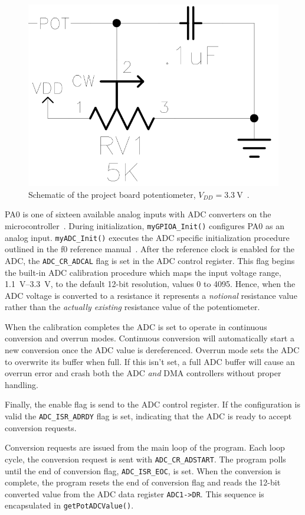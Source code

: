 \begin{figure}[tbph]
  \centering
  \includegraphics[width=0.4\linewidth]{../graphics/schematic_pot}
  \caption{Schematic of the project board potentiometer, $V_{DD} = \SI{3.3}{\volt}$~\cite{FS:PBMCUSLK}.}
  \label{fig:schematic_pot}
\end{figure}

PA0 is one of sixteen available analog inputs with ADC converters on the microcontroller~\cite[ch. 13]{STM:f0ref}.
During initialization, \texttt{myGPIOA\_Init()} configures PA0 as an analog input. \texttt{myADC\_Init()} executes the ADC specific initialization procedure outlined in the f0 reference manual~\cite[ch. 13]{STM:f0ref}.
After the reference clock is enabled for the ADC, the \texttt{ADC\_CR\_ADCAL} flag is set in the ADC control register.
This flag begins the built-in ADC calibration procedure which maps the input voltage range, \SIrange{1.1}{3.3}{\volt}, to the default 12-bit resolution, values 0 to 4095.
Hence, when the ADC voltage is converted to a resistance it represents a \textit{notional} resistance value rather than the \textit{actually existing} resistance value of the potentiometer.

When the calibration completes the ADC is set to operate in continuous conversion and overrun modes.
Continuous conversion will automatically start a new conversion once the ADC value is dereferenced.
Overrun mode sets the ADC to overwrite its buffer when full.
If this isn't set, a full ADC buffer will cause an overrun error and crash both the ADC \textit{and} DMA controllers without proper handling.

Finally, the enable flag is send to the ADC control register.
If the configuration is valid the \texttt{ADC\_ISR\_ADRDY} flag is set, indicating that the ADC is ready to accept conversion requests.

Conversion requests are issued from the main loop of the program.
Each loop cycle, the conversion request is sent with \texttt{ADC\_CR\_ADSTART}.
The program polls until the end of conversion flag, \texttt{ADC\_ISR\_EOC}, is set.
When the conversion is complete, the program resets the end of conversion flag and reads the 12-bit converted value from the ADC data register \texttt{ADC1->DR}.
This sequence is encapsulated in \texttt{getPotADCValue()}.

